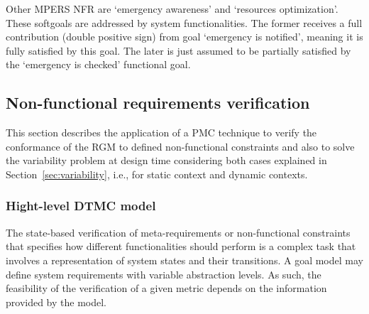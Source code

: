 
Other MPERS NFR are `emergency awareness' and `resources optimization'. These softgoals are addressed by system functionalities. The former receives a full contribution (double positive sign) from goal `emergency is notified', meaning it is fully satisfied by this goal. The later is just assumed to be partially satisfied by the `emergency is checked' functional goal.

\subsection{Non-functional requirements verification}



This section describes the application of a PMC technique to verify the conformance of the RGM to defined non-functional constraints and also to solve the variability problem at design time considering both cases explained in Section~\ref{sec:variability}, i.e., for static context and dynamic contexts.

\subsubsection{Hight-level DTMC model}


The state-based verification of meta-requirements or non-functional constraints that specifies how different functionalities should perform is a complex task that involves a representation of system states and their transitions. A goal model may define system requirements with variable abstraction levels. As such, the feasibility of the verification of a given metric depends on the information provided by the model.

